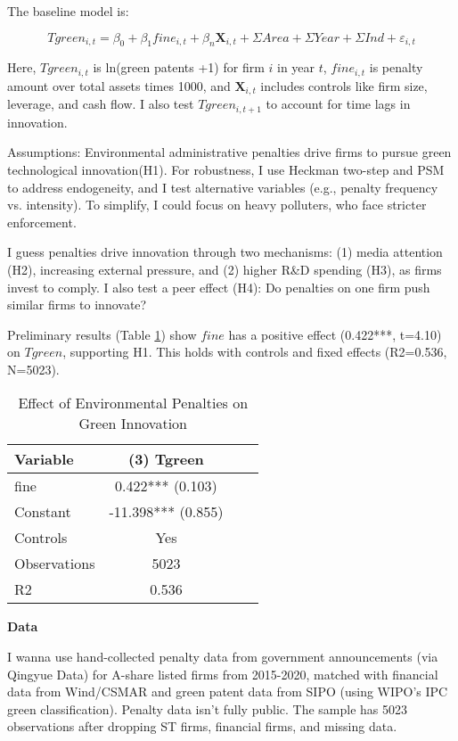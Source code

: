\documentclass[12pt]{article}
\begin{document}
The baseline model is:

\[ Tgreen_{i,t} = \beta_0 + \beta_1 fine_{i,t} + \beta_n \mathbf{X}_{i,t} + \Sigma Area + \Sigma Year + \Sigma Ind + \varepsilon_{i,t} \]

Here, $Tgreen_{i,t}$ is ln(green patents +1) for firm $i$ in year $t$, $fine_{i,t}$ is penalty amount over total assets times 1000, and $\mathbf{X}_{i,t}$ includes controls like firm size, leverage, and cash flow. I also test $Tgreen_{i,t+1}$ to account for time lags in innovation.

Assumptions: Environmental administrative penalties drive firms to pursue green technological innovation(H1). For robustness, I use Heckman two-step and PSM to address endogeneity, and I test alternative variables (e.g., penalty frequency vs. intensity). To simplify, I could focus on heavy polluters, who face stricter enforcement.

I guess penalties drive innovation through two mechanisms: (1) media attention (H2), increasing external pressure, and (2) higher R\&D spending (H3), as firms invest to comply. I also test a peer effect (H4): Do penalties on one firm push similar firms to innovate?

Preliminary results (Table \ref{tab:results}) show $fine$ has a positive effect (0.422***, t=4.10) on $Tgreen$, supporting H1. This holds with controls and fixed effects (R2=0.536, N=5023).

\begin{table}[h]
\centering
\caption{Effect of Environmental Penalties on Green Innovation}
\label{tab:results}
\begin{tabular}{lccc}
\toprule
Variable & (3) Tgreen \\
\midrule
fine & 0.422*** (0.103) \\
Constant & -11.398*** (0.855) \\
Controls & Yes \\
Observations & 5023 \\
R2 & 0.536 \\
\bottomrule
\end{tabular}
\end{table}

\textbf{Data}

I wanna use hand-collected penalty data from government announcements (via Qingyue Data) for A-share listed firms from 2015-2020, matched with financial data from Wind/CSMAR and green patent data from SIPO (using WIPO’s IPC green classification). Penalty data isn’t fully public. The sample has 5023 observations after dropping ST firms, financial firms, and missing data.
\end{document}
